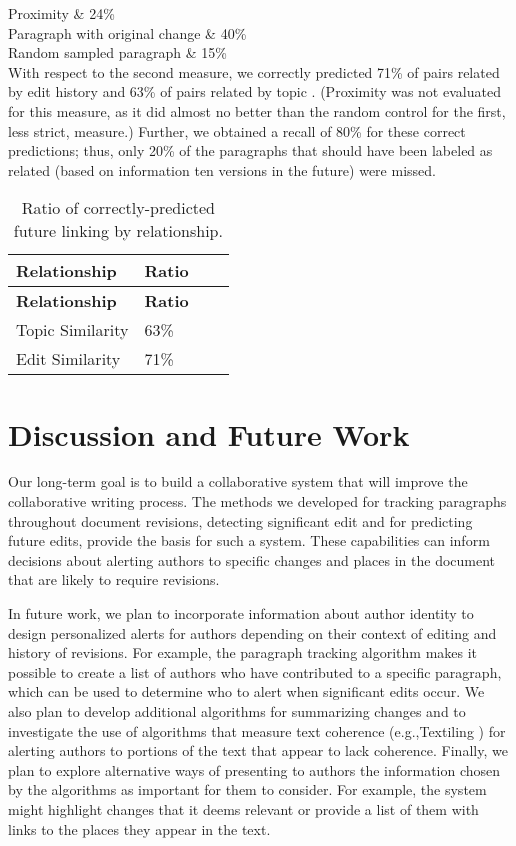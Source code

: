 Proximity \& 24\%\\

Paragraph with original change \& 40\%\\

Random sampled paragraph \& 15\%\\

With respect to the second measure, we correctly predicted 71\% of pairs
related by edit history and 63\% of pairs related by topic . (Proximity
was not evaluated for this measure, as it did almost no better than the
random control for the first, less strict, measure.) Further, we
obtained a recall of 80\% for these correct predictions; thus, only 20\%
of the paragraphs that should have been labeled as related (based on
information ten versions in the future) were missed.

\begin{longtable}[c]{@{}llll@{}}
\caption{Ratio of correctly-predicted future linking by
relationship.{}}\tabularnewline
\toprule
\textbf{Relationship} & \textbf{Ratio} & &\tabularnewline
\midrule
\endfirsthead
\toprule
\textbf{Relationship} & \textbf{Ratio} & &\tabularnewline
\midrule
\endhead
Topic Similarity & 63\% & &\tabularnewline
Edit Similarity & 71\% & &\tabularnewline
\bottomrule
\end{longtable}

\section{Discussion and Future Work}\label{discussion-and-future-work}

Our long-term goal is to build a collaborative system that will improve
the collaborative writing process. The methods we developed for tracking
paragraphs throughout document revisions, detecting significant edit and
for predicting future edits, provide the basis for such a system. These
capabilities can inform decisions about alerting authors to specific
changes and places in the document that are likely to require revisions.

In future work, we plan to incorporate information about author identity
to design personalized alerts for authors depending on their context of
editing and history of revisions. For example, the paragraph tracking
algorithm makes it possible to create a list of authors who have
contributed to a specific paragraph, which can be used to determine who
to alert when significant edits occur. We also plan to develop
additional algorithms for summarizing changes and to investigate the use
of algorithms that measure text coherence (e.g.,Textiling
\cite{hearst1994multi}) for alerting authors to portions of the text
that appear to lack coherence. Finally, we plan to explore alternative
ways of presenting to authors the information chosen by the algorithms
as important for them to consider. For example, the system might
highlight changes that it deems relevant or provide a list of them with
links to the places they appear in the text.
